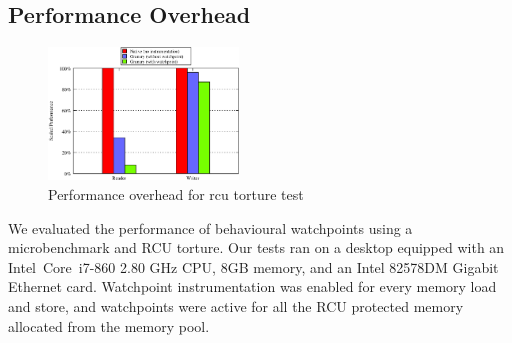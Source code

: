 \subsection{Performance Overhead}
\begin{figure}
\centering
 	\includegraphics[width=0.45\textwidth]{performance}
\caption{Performance overhead for rcu torture test}\label{fig:perf}
\end{figure}
We evaluated the performance of behavioural watchpoints using a microbenchmark and RCU torture. Our tests ran on a desktop equipped with an Intel\textregistered\ Core\texttrademark\ i7-860 2.80 GHz CPU, 8GB memory, and an Intel 82578DM Gigabit Ethernet card. Watchpoint instrumentation was enabled for every memory load and store, and watchpoints were active for all the RCU protected memory allocated from the memory pool.

